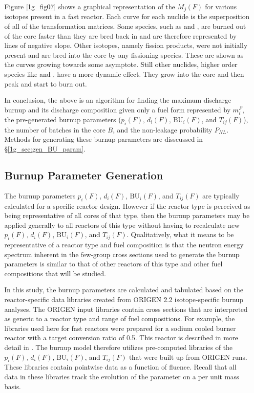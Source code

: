 Figure \ref{1g_fig07} shows a graphical representation of the $M_j(F)$ for various isotopes present 
in a fast reactor.  Each curve for each nuclide is the superposition of all of the transformation 
matrices.  Some species, such as  and , 
are burned out of the core faster than they are bred back in and are therefore represented by lines of 
negative slope.  Other isotopes, namely fission products, were not initially present and are bred into 
the core by any fissioning species.  These are shown as the curves growing towards some asymptote.  
Still other nuclides, higher order species like  and , have a more dynamic effect.  
They grow into the core and then peak and start to burn out.  

In conclusion, the above is an algorithm for finding the maximum discharge burnup and its discharge 
composition given only a fuel form represented by $m_i^F$, the pre-generated burnup parameters ($p_i(F)$, 
$d_i(F)$, $\mbox{BU}_i(F)$, and $T_{ij}(F)$), the number of batches in the core $B$, and the non-leakage 
probability $P_{NL}$.  Methods for generating these burnup parameters are disscussed in 
\S \ref{1g_sec:gen_BU_param}.



\subsection{Burnup Parameter Generation}
\label{1g_sec:gen_BU_param}
The burnup parameters $p_i(F)$, $d_i(F)$, $\mbox{BU}_i(F)$, and $T_{ij}(F)$ are typically calculated 
for a specific reactor design.  However if the reactor type is perceived as being representative of 
all cores of that type, then the burnup parameters may be applied generally to all reactors of this 
type without having to recalculate new $p_i(F)$, $d_i(F)$, $\mbox{BU}_i(F)$, and $T_{ij}(F)$.  
Qualitatively, what it means to be representative of a reactor type and fuel composition is that the 
neutron energy spectrum inherent in the few-group cross sections used to generate the burnup parameters 
is similar to that of other reactors of this type and other fuel compositions that will be studied.   

In this study, the burnup parameters are calculated and tabulated based on the reactor-specific data 
libraries created from ORIGEN 2.2 \cite{Croff2002} isotope-specific burnup analyses.  The ORIGEN 
input libraries contain cross sections that are interpreted as generic to a reactor type and range of 
fuel compositions.  For example, the libraries used here for fast reactors were prepared for a sodium 
cooled burner reactor with a target conversion ratio of 0.5.  This reactor is described in more detail 
in \cite{INL/CON-07-12478}.  The burnup model therefore utilizes pre-computed libraries of the 
$p_i(F)$, $d_i(F)$, $\mbox{BU}_i(F)$, and $T_{ij}(F)$ that were built up from ORIGEN runs.  
These libraries contain pointwise data as a function of fluence.  Recall that all data in these 
libraries track the evolution of the parameter on a per unit mass basis.

